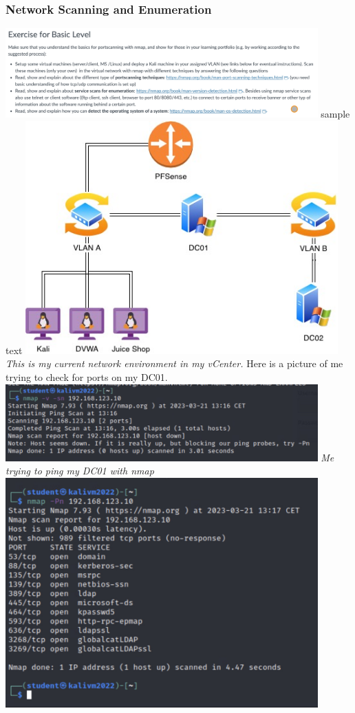 \documentclass[12pt, letterpaper]{article}
\begin{document}
\subsubsection{Network Scanning and Enumeration}
\includegraphics[width=0.9\textwidth]{fotos/Week 5/Network Scanning and Enumeration.jpeg}
\hfill\break
sample text
\hfill\break
\includegraphics[width=0.9\textwidth]{fotos/Week 5/Semester 4 Week 5 netwerk tekening.jpg}
\break
\emph{This is my current network environment in my vCenter.}
\hfill\break
\hfill\break
Here is a picture of me trying to check for ports on my DC01.
\hfill\break
\hfill\break
\includegraphics[width=0.9\textwidth]{fotos/Week 5/NMap pinging test.jpeg}
\break
\emph{Me trying to ping my DC01 with nmap}
\hfill\break
\hfill\break
\includegraphics[width=0.9\textwidth]{fotos/Week 5/NMa- pinging ports.jpeg}
\end{document}
